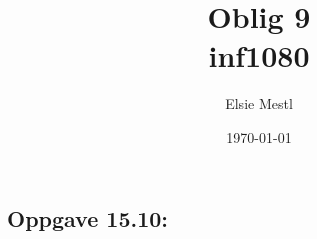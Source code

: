 \documentclass[a4paper, norsk, 10pt]{article}
\date{\today}
\title{Oblig 9 \\ inf1080}
\author{Elsie Mestl}
\begin{document}
\maketitle
\begin{flushleft}

  \section*{Oppgave 15.10:}
  


\end{flushleft}
\end{document}
